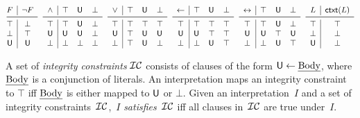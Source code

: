 \documentclass[12pt]{article}
\begin{document}
\begin{table}[t]
\[\small
\begin{array}[c]{@{\hspace{0mm}}c|c}
F & \neg F\\ \midrule
\top & \bot \\
\bot & \top \\
\udf & \udf
\end{array}
\;\
\begin{array}{c|lll}
 \wedge & \top & \udf & \bot \\
\midrule
\top & \top & \udf & \bot \\
\udf & \udf & \udf & \bot \\
\bot & \bot & \bot & \bot
 \end{array}
\;\
\begin{array}{c|lll}
 \vee & \top & \udf & \bot \\
\midrule
\top & \top & \top & \top \\
\udf & \top & \udf & \udf \\
\bot & \top & \udf & \bot
 \end{array}
\;\
\begin{array}{c|lll}
\leftarrow & \top & \udf & \bot \\
\midrule
\top & \top & \top & \top \\
\udf & \udf & \top & \top \\
\bot & \bot & \udf & \top
 \end{array}
\;\
\begin{array}{c|ccc}
  \leftrightarrow  & \top & \udf & \bot \\
  \midrule
\top & \top & \udf & \bot \\
\udf & \udf & \top & \udf\\
\bot & \bot & \udf & \top
 \end{array}
\;\
\begin{array}{c|c}
 L & \cxt(L)\\
\midrule
\top & \top \\
\bot & \bot  \\
\udf & \bot
\end{array}
\]
\caption{The truth tables for the connectives under the three-valued {\L}ukasiewicz logic and for $\cxt$. $L$ is a literal and $\top$, $\bot$, and $\udf$ denote \textit{true}, \textit{false},
and \textit{unknown}, respectively.\label{tab:3vldluka}}
\end{table}

A set of \textit{integrity constraints} ${\cal IC}$ consists of clauses of
the form $\mathsf{U} \leftarrow \mbox{\em Body}$, where $\mbox{\em Body}$ is a conjunction of
literals. An interpretation maps
an integrity constraint to $\top$ iff $\mbox{\em Body}$ is either mapped to
$\udf$ or $\bot$.  
Given an interpretation~$I$
and a set of integrity constraints~${\cal IC}$,~$I$ \textit{satisfies}~${\cal IC}$
iff all clauses in~${\cal IC}$ are true under~$I$.
\end{document}
